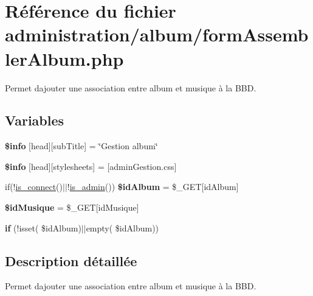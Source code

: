 \hypertarget{formAssemblerAlbum_8php}{}\section{Référence du fichier administration/album/form\+Assembler\+Album.php}
\label{formAssemblerAlbum_8php}


Permet d\textquotesingle{}ajouter une association entre album et musique à la B\+BD.  


\subsection*{Variables}
\begin{DoxyCompactItemize}
\item 
\mbox{\label{formAssemblerAlbum_8php_a024f87f9bf4f3b33710e2e7ff8f60823}} 
{\bfseries \$info} \mbox{[}\textquotesingle{}head\textquotesingle{}\mbox{]}\mbox{[}\textquotesingle{}sub\+Title\textquotesingle{}\mbox{]} = \char`\"{}Gestion album\char`\"{}
\item 
\mbox{\label{formAssemblerAlbum_8php_af6044c8bf78ebc8c58057e14d7738bbd}} 
{\bfseries \$info} \mbox{[}\textquotesingle{}head\textquotesingle{}\mbox{]}\mbox{[}\textquotesingle{}stylesheets\textquotesingle{}\mbox{]} = \mbox{[}\textquotesingle{}admin\+Gestion.\+css\textquotesingle{}\mbox{]}
\item 
\mbox{\label{formAssemblerAlbum_8php_a030bb3e44494fd5720143056bb7a90d8}} 
if(!\hyperlink{fonctionCompte_8php_a2fe594e0482307b8729ea37780d6f74b}{is\+\_\+connect}()$\vert$$\vert$!\hyperlink{fonctionCompte_8php_a0b327581800dba50ad70720e23ae2ed2}{is\+\_\+admin}()) {\bfseries \$id\+Album} = \$\+\_\+\+G\+ET\mbox{[}\textquotesingle{}id\+Album\textquotesingle{}\mbox{]}
\item 
\mbox{\label{formAssemblerAlbum_8php_a29391e8023617865b8749e5e096da8ff}} 
{\bfseries \$id\+Musique} = \$\+\_\+\+G\+ET\mbox{[}\textquotesingle{}id\+Musique\textquotesingle{}\mbox{]}
\item 
\mbox{\label{formAssemblerAlbum_8php_a775b2028635d3e69cf885c3787e44dab}} 
{\bfseries if} (!isset( \$id\+Album)$\vert$$\vert$empty( \$id\+Album))
\end{DoxyCompactItemize}


\subsection{Description détaillée}
Permet d\textquotesingle{}ajouter une association entre album et musique à la B\+BD. 

